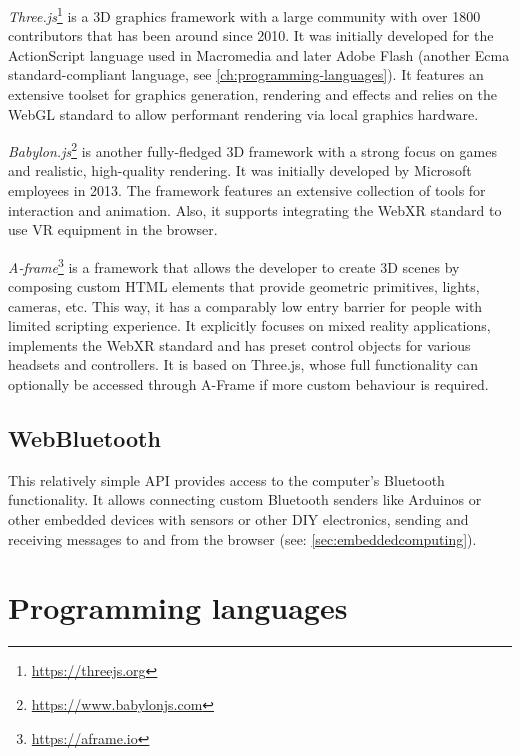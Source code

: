 

\emph{Three.js}\footnote{\url{https://threejs.org}} is a \ac{3D} graphics framework with a large community with over 1800 contributors that has been around since 2010.
It was initially developed for the ActionScript language used in Macromedia and later Adobe Flash (another Ecma standard-compliant language, see \autoref{ch:programming-languages}). It features an extensive toolset for graphics generation, rendering and effects and relies on the WebGL standard to allow performant rendering via local graphics hardware.

\emph{Babylon.js}\footnote{\url{https://www.babylonjs.com}} is another fully-fledged \ac{3D} framework with a strong focus on games and realistic, high-quality rendering.
It was initially developed by Microsoft employees in 2013.
The framework features an extensive collection of tools for interaction and animation.
Also, it supports integrating the \ac{WebXR} standard to use \ac{VR} equipment in the browser.

\emph{A-frame}\footnote{\url{https://aframe.io}} is a framework that allows the developer to create \ac{3D} scenes by composing custom HTML elements that provide geometric primitives, lights, cameras, etc.
This way, it has a comparably low entry barrier for people with limited scripting experience.
It explicitly focuses on mixed reality applications, implements the WebXR standard and has preset control objects for various headsets and controllers.
It is based on Three.js, whose full functionality can optionally be accessed through A-Frame if more custom behaviour is required.

\subsection{WebBluetooth}

This relatively simple \ac{API} provides access to the computer's Bluetooth functionality.
It allows connecting custom Bluetooth senders like Arduinos or other embedded devices with sensors or other \ac{DIY} electronics, sending and receiving messages to and from the browser (see: \autoref{sec:embeddedcomputing}).

\section{Programming languages}
\label{sec:programming-languages}



